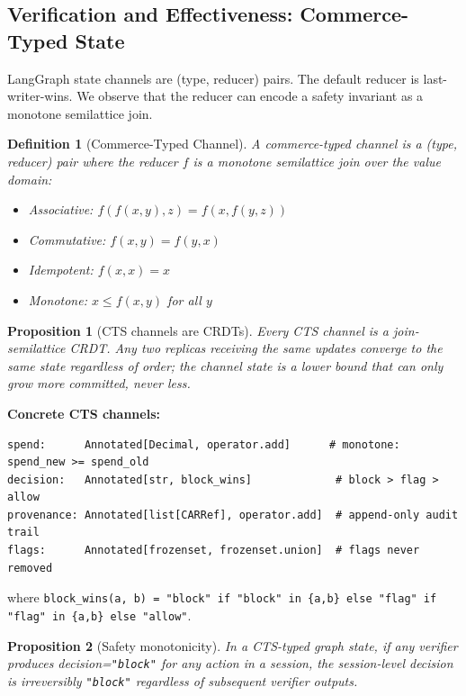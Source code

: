 \documentclass{article}
\newtheorem{definition}{Definition}
\newtheorem{proposition}{Proposition}
\begin{document}
\subsection{Verification and Effectiveness: Commerce-Typed State}
\label{sec:cts}

LangGraph state channels are (type, reducer) pairs. The default reducer is last-writer-wins. We observe that the reducer can encode a safety invariant as a monotone semilattice join.

\begin{definition}[Commerce-Typed Channel]
A \emph{commerce-typed channel} is a (type, reducer) pair where the reducer $f$ is a monotone semilattice join over the value domain:
\begin{itemize}
\item Associative: $f(f(x,y),z) = f(x,f(y,z))$
\item Commutative: $f(x,y) = f(y,x)$
\item Idempotent: $f(x,x) = x$
\item Monotone: $x \leq f(x,y)$ for all $y$
\end{itemize}
\end{definition}

\begin{proposition}[CTS channels are CRDTs]
Every CTS channel is a join-semilattice CRDT. Any two replicas receiving the same updates converge to the same state regardless of order; the channel state is a lower bound that can only grow more committed, never less.
\end{proposition}

\textbf{Concrete CTS channels:}
\begin{lstlisting}
spend:      Annotated[Decimal, operator.add]      # monotone: spend_new >= spend_old
decision:   Annotated[str, block_wins]             # block > flag > allow
provenance: Annotated[list[CARRef], operator.add]  # append-only audit trail
flags:      Annotated[frozenset, frozenset.union]  # flags never removed
\end{lstlisting}

where \texttt{block\_wins(a, b) = "block" if "block" in \{a,b\} else "flag" if "flag" in \{a,b\} else "allow"}.

\begin{proposition}[Safety monotonicity]
\label{thm:monotone}
In a CTS-typed graph state, if any verifier produces decision=\texttt{"block"} for any action in a session, the session-level decision is irreversibly \texttt{"block"} regardless of subsequent verifier outputs.
\end{proposition}
\end{document}
